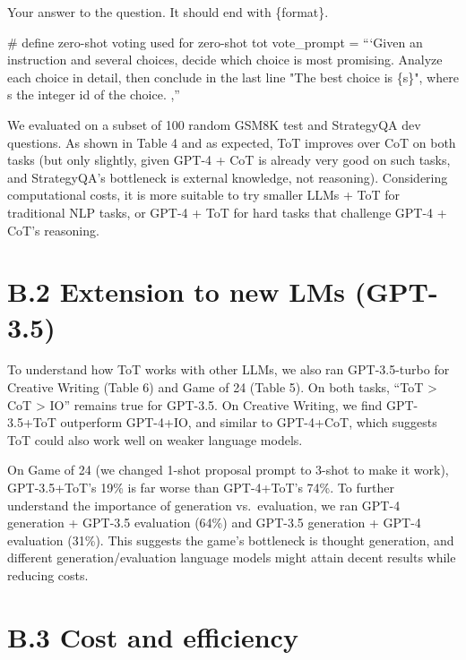 \documentclass[
]{article}
\newenvironment{Shaded}{}{}
\newcommand{\NormalTok}[1]{#1}
\begin{document}
Your answer to the question. It should end with \{format\}.

\begin{Shaded}
\begin{Highlighting}[]
\NormalTok{\# define zero{-}shot voting used for zero{-}shot tot}
\NormalTok{vote\_prompt = “‘Given an instruction and several choices,}
\NormalTok{decide which choice is most promising.}
\NormalTok{Analyze each choice in detail, then conclude in the last line}
\NormalTok{"The best choice is \{s\}", where s the integer id of the choice.}
\NormalTok{,” }
\end{Highlighting}
\end{Shaded}

We evaluated on a subset of 100 random GSM8K test and StrategyQA dev
questions. As shown in Table 4 and as expected, ToT improves over CoT on
both tasks (but only slightly, given GPT-4 + CoT is already very good on
such tasks, and StrategyQA's bottleneck is external knowledge, not
reasoning). Considering computational costs, it is more suitable to try
smaller LLMs + ToT for traditional NLP tasks, or GPT-4 + ToT for hard
tasks that challenge GPT-4 + CoT's reasoning.

\section{B.2 Extension to new LMs
(GPT-3.5)}\label{b.2-extension-to-new-lms-gpt-3.5}

To understand how ToT works with other LLMs, we also ran GPT-3.5-turbo
for Creative Writing (Table 6) and Game of 24 (Table 5). On both tasks,
``ToT \textgreater{} CoT \textgreater{} IO'' remains true for GPT-3.5.
On Creative Writing, we find GPT-3.5+ToT outperform GPT-4+IO, and
similar to GPT-4+CoT, which suggests ToT could also work well on weaker
language models.

On Game of 24 (we changed 1-shot proposal prompt to 3-shot to make it
work), GPT-3.5+ToT's 19\% is far worse than GPT-4+ToT's 74\%. To further
understand the importance of generation vs.~evaluation, we ran GPT-4
generation + GPT-3.5 evaluation (64\%) and GPT-3.5 generation + GPT-4
evaluation (31\%). This suggests the game's bottleneck is thought
generation, and different generation/evaluation language models might
attain decent results while reducing costs.

\section{B.3 Cost and efficiency}\label{b.3-cost-and-efficiency}
\end{document}
